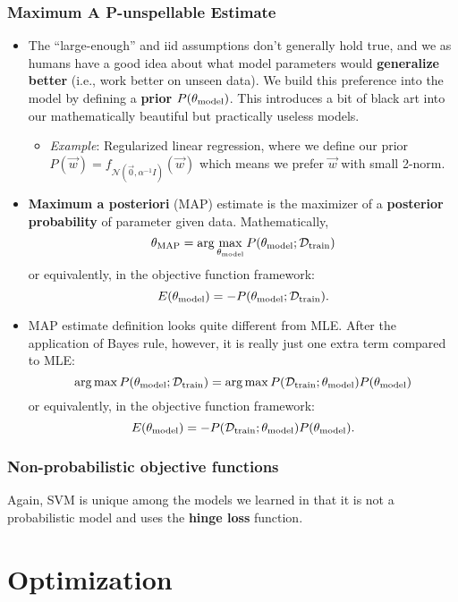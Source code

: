 \documentclass{discussion}
\providecommand{\tightlist}{%
\setlength{\itemsep}{2pt}\setlength{\parskip}{0pt}}
\begin{document}
\subsubsection{Maximum A P-unspellable Estimate}

\begin{itemize}
\tightlist
\item
  The ``large-enough'' and iid assumptions don't generally hold true,
  and we as humans have a good idea about what model parameters would
  \textbf{generalize better} (i.e., work better on unseen data). We
  build this preference into the model by defining a \textbf{prior}
  \(P(\mathbf{\theta}_{\text{model}})\). This introduces a bit of black art into our mathematically
  beautiful but practically useless models.

  \begin{itemize}
  \tightlist
  \item
    \emph{Example}: Regularized linear regression, where we define our
    prior
    \(P(\vec{w}) = f_{\mathcal{N}(\vec{0}, \alpha^{-1}I)}(\vec{w})\)
    which means we prefer \(\vec{w}\) with small 2-norm.
  \end{itemize}
\item
  \textbf{Maximum a posteriori} (MAP) estimate is the maximizer of a
  \textbf{posterior probability} of parameter given data.
  Mathematically,
  \[\theta_{\mathrm{MAP}} = \arg\max_{\mathbf{\theta}_{\text{model}}} P(\mathbf{\theta}_{\text{model}}; \mathcal{D}_{\mathrm{train}})\] or
  equivalently, in the objective function framework:
  \[E(\mathbf{\theta}_{\text{model}}) = -P(\mathbf{\theta}_{\text{model}}; \mathcal{D}_{\mathrm{train}}).\]
\item
  MAP estimate definition looks quite different from MLE. After the
  application of Bayes rule, however, it is really just one extra term
  compared to MLE:
  \[\arg\max P(\mathbf{\theta}_{\text{model}}; \mathcal{D}_{\mathrm{train}}) = \arg\max P(\mathcal{D}_{\mathrm{train}}; \mathbf{\theta}_{\text{model}}) P(\mathbf{\theta}_{\text{model}})\] or
  equivalently, in the objective function framework:
  \[E(\mathbf{\theta}_{\text{model}}) = -P(\mathcal{D}_{\mathrm{train}}; \mathbf{\theta}_{\text{model}})P(\mathbf{\theta}_{\text{model}}).\]
\end{itemize}

\subsubsection{Non-probabilistic objective functions}
Again, SVM is unique among the models we learned in that it is not a
probabilistic model and uses the \textbf{hinge loss} function.

\section{Optimization}\label{optimization}
\end{document}
